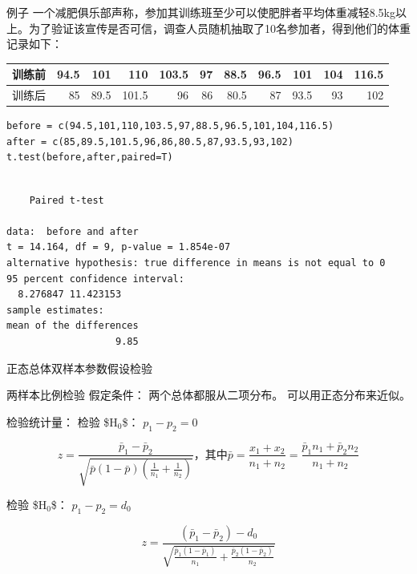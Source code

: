 \documentclass[presentation]{beamer}
\begin{document}
\begin{frame}[fragile,label={sec:orgbfd088a}]{例子}
 一个减肥俱乐部声称，参加其训练班至少可以使肥胖者平均体重减轻8.5kg以上。为了验证该宣传是否可信，调查人员随机抽取了10名参加者，得到他们的体重记录如下：

\begin{center}
\begin{tabular}{lrrrrrrrrrr}
训练前 & 94.5 & 101 & 110 & 103.5 & 97 & 88.5 & 96.5 & 101 & 104 & 116.5\\
\hline
训练后 & 85 & 89.5 & 101.5 & 96 & 86 & 80.5 & 87 & 93.5 & 93 & 102\\
\end{tabular}
\end{center}

\begin{verbatim}
before = c(94.5,101,110,103.5,97,88.5,96.5,101,104,116.5)
after = c(85,89.5,101.5,96,86,80.5,87,93.5,93,102)
t.test(before,after,paired=T)
\end{verbatim}

\begin{verbatim}

	Paired t-test

data:  before and after
t = 14.164, df = 9, p-value = 1.854e-07
alternative hypothesis: true difference in means is not equal to 0
95 percent confidence interval:
  8.276847 11.423153
sample estimates:
mean of the differences 
                   9.85 

\end{verbatim}
\end{frame}


\begin{frame}[label={sec:orga958ce6}]{正态总体双样本参数假设检验}
\begin{block}{两样本比例检验}
假定条件：
 两个总体都服从二项分布。
 可以用正态分布来近似。

检验统计量：  
检验 \$H\(_{\text{0}}\)\$： \(p_1-p_2=0\)

$$ z=\frac{\bar p_1-\bar p_2}{\sqrt{\bar p(1-\bar p)(\frac{1}{n_1}+\frac{1}{n_2})}}，其中\bar p=\frac{x_1+x_2}{n_1+n_2}=\frac{\bar p_1n_1+\bar p_2n_2}{n_1+n_2}$$

检验 \$H\(_{\text{0}}\)\$： \(p_1-p_2=d_0\)

$$ z=\frac{(\bar p_1-\bar p_2)-d_0}{\sqrt{\frac{\bar p_1(1-\bar p_1)}{n_1}+\frac{\bar p_2(1-\bar p_2)}{n_2}}}$$
\end{block}
\end{frame}
\end{document}

